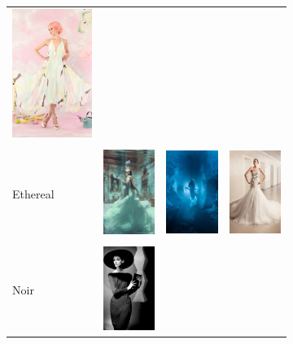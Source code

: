\begin{figure}
\begin{subfigure}[t]{0.48\linewidth}
\begin{tabular}{m{.05in}|m{\dgap} m{\dgap} m{\dgap}}
    \includegraphics[width=.8in]{../style/figures/flickr_on_pinterest/dress/pred_style_Pastel/h/2.jpg} \\ \\
    \begin{turn}{90}\small{Ethereal}\end{turn} &
    \includegraphics[width=.8in]{../style/figures/flickr_on_pinterest/dress/pred_style_Ethereal/h/0.jpg} &
    \includegraphics[width=.8in]{../style/figures/flickr_on_pinterest/dress/pred_style_Ethereal/h/1.jpg} &
    \includegraphics[width=.8in]{../style/figures/flickr_on_pinterest/dress/pred_style_Ethereal/h/2.jpg} \\ \\
    \begin{turn}{90}\small{Noir}\end{turn} &
    \includegraphics[width=.8in]{../style/figures/flickr_on_pinterest/dress/pred_style_Noir/h/0.jpg} &

\end{tabular}
\end{subfigure}
\end{figure}

